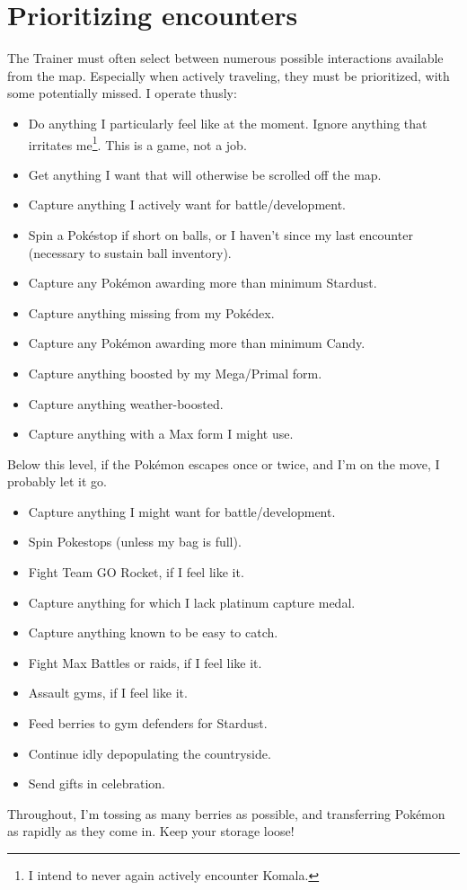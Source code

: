 \section{Prioritizing encounters\label{sec:prioritymap}}
The Trainer must often select between numerous possible interactions available from the map.
Especially when actively traveling, they must be prioritized, with some potentially missed.
I operate thusly:
\begin{itemize}
\item Do anything I particularly feel like at the moment.
      Ignore anything that irritates me\footnote{I intend to never again actively encounter Komala.}.
      This is a game, not a job.
\item Get anything I want that will otherwise be scrolled off the map.
\item Capture anything I actively want for battle/development.
\item Spin a Pokéstop if short on balls, or I haven't since my last encounter (necessary to sustain ball inventory).
\item Capture any Pokémon awarding more than minimum Stardust.
\item Capture anything missing from my Pokédex.
\item Capture any Pokémon awarding more than minimum Candy.
\item Capture anything boosted by my Mega/Primal form.
\item Capture anything weather-boosted.
\item Capture anything with a Max form I might use.
\end{itemize}
Below this level, if the Pokémon escapes once or twice, and I'm on the move,
I probably let it go.
\begin{itemize}
\item Capture anything I might want for battle/development.
\item Spin Pokestops (unless my bag is full).
\item Fight Team GO Rocket, if I feel like it.
\item Capture anything for which I lack platinum capture medal.
\item Capture anything known to be easy to catch.
\item Fight Max Battles or raids, if I feel like it.
\item Assault gyms, if I feel like it.
\item Feed berries to gym defenders for Stardust.
\item Continue idly depopulating the countryside.
\item Send gifts in celebration.
\end{itemize}
Throughout, I'm tossing as many berries as possible, and
 transferring Pokémon as rapidly as they come in.
Keep your storage loose!

